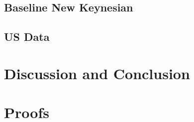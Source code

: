 \documentclass{article}
\begin{document}
\subsection{Baseline New Keynesian}

\subsection{US Data}

\section{Discussion and Conclusion}

\newpage
\printbibliography

\newpage
\appendix
\section{Proofs} \label{proofs}
\end{document}
